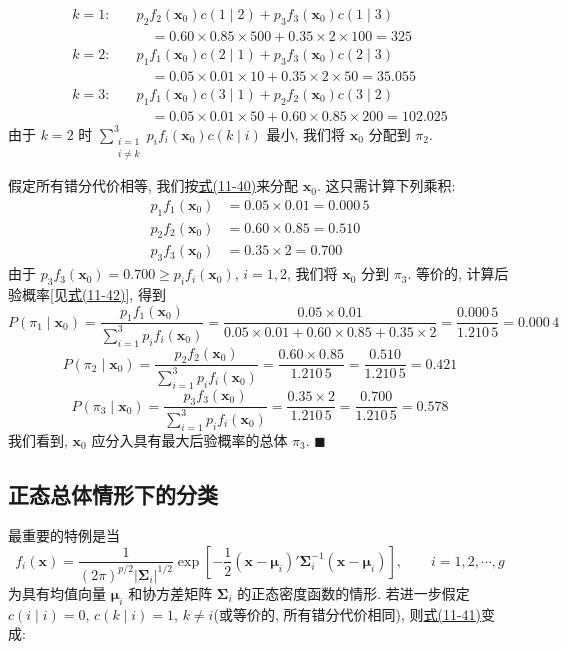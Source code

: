 
\[
\begin{aligned}
k=1:\quad &p_2f_2(\mathbf{x}_0)c(1\mid 2)+p_3f_3(\mathbf{x}_0)c(1\mid 3)\\
&\quad=0.60\times 0.85\times 500+0.35\times 2\times 100=325\\
k=2:\quad &p_1f_1(\mathbf{x}_0)c(2\mid 1)+p_3f_3(\mathbf{x}_0)c(2\mid 3)\\
&\quad=0.05\times 0.01\times 10+0.35\times 2\times 50=35.055\\
k=3:\quad &p_1f_1(\mathbf{x}_0)c(3\mid 1)+p_2f_2(\mathbf{x}_0)c(3\mid 2)\\
&\quad=0.05\times 0.01\times 50+0.60\times 0.85\times 200=102.025
\end{aligned}
\]
由于 $k=2$ 时 $\sum_{\substack{i=1\\i\ne k}}^{3}p_if_i(\mathbf{x}_0)c(k\mid i)$ 最小, 我们将 $\mathbf{x}_0$ 分配到 $\pi_2$.

假定所有错分代价相等, 我们按\hyperref[eq:11-40]{式(11-40)}来分配 $\mathbf{x}_0$. 这只需计算下列乘积:
\[
\begin{aligned}
p_1f_1(\mathbf{x}_0)&=0.05\times 0.01=0.000\,5\\
p_2f_2(\mathbf{x}_0)&=0.60\times 0.85=0.510\\
p_3f_3(\mathbf{x}_0)&=0.35\times 2=0.700
\end{aligned}
\]
由于 $p_3f_3(\mathbf{x}_0)=0.700\ge p_if_i(\mathbf{x}_0)$, $i=1,2$, 我们将 $\mathbf{x}_0$ 分到 $\pi_3$. 等价的, 计算后验概率[见\hyperref[eq:11-42]{式(11-42)}], 得到
\[
P(\pi_1\mid \mathbf{x}_0)=\frac{p_1f_1(\mathbf{x}_0)}{\sum_{i=1}^{3}p_if_i(\mathbf{x}_0)}=\frac{0.05\times 0.01}{0.05\times 0.01+0.60\times 0.85+0.35\times 2}=\frac{0.000\,5}{1.210\,5}=0.000\,4
\]
\[
P(\pi_2\mid \mathbf{x}_0)=\frac{p_2f_2(\mathbf{x}_0)}{\sum_{i=1}^{3}p_if_i(\mathbf{x}_0)}=\frac{0.60\times 0.85}{1.210\,5}=\frac{0.510}{1.210\,5}=0.421
\]
\[
P(\pi_3\mid \mathbf{x}_0)=\frac{p_3f_3(\mathbf{x}_0)}{\sum_{i=1}^{3}p_if_i(\mathbf{x}_0)}=\frac{0.35\times 2}{1.210\,5}=\frac{0.700}{1.210\,5}=0.578
\]
我们看到, $\mathbf{x}_0$ 应分入具有最大后验概率的总体 $\pi_3$. \hfill$\blacksquare$

\subsection*{正态总体情形下的分类}

最重要的特例是当
\label{eq:11-43}
\begin{equation}
f_i(\mathbf{x})=\frac{1}{(2\pi)^{p/2}|\boldsymbol{\Sigma}_i|^{1/2}}\exp\left[-\frac{1}{2}(\mathbf{x}-\boldsymbol{\mu}_i)'\boldsymbol{\Sigma}_i^{-1}(\mathbf{x}-\boldsymbol{\mu}_i)\right],\qquad i=1,2,\cdots,g
\tag{11-43}
\end{equation}
为具有均值向量 $\boldsymbol{\mu}_i$ 和协方差矩阵 $\boldsymbol{\Sigma}_i$ 的正态密度函数的情形. 若进一步假定 $c(i\mid i)=0$, $c(k\mid i)=1$, $k\ne i$(或等价的, 所有错分代价相同), 则\hyperref[eq:11-41]{式(11-41)}变成:

